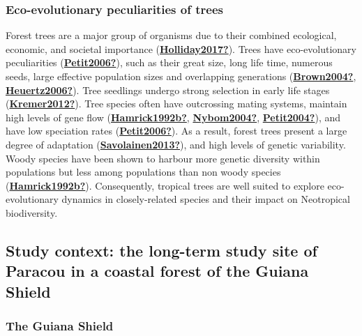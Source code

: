 \documentclass[12pt,twoside,a4paper, a]{article}
\begin{document}
\hypertarget{eco-evolutionary-peculiarities-of-trees}{%
\subsubsection{Eco-evolutionary peculiarities of trees}\label{eco-evolutionary-peculiarities-of-trees}}

Forest trees are a major group of organisms due to their combined ecological, economic, and societal importance (\protect\hyperlink{ref-Holliday2017}{\textbf{Holliday2017?}}).
Trees have eco-evolutionary peculiarities (\protect\hyperlink{ref-Petit2006}{\textbf{Petit2006?}}),
such as their great size, long life time, numerous seeds, large effective population sizes and overlapping generations (\protect\hyperlink{ref-Brown2004}{\textbf{Brown2004?}}, \protect\hyperlink{ref-Heuertz2006}{\textbf{Heuertz2006?}}).
Tree seedlings undergo strong selection in early life stages (\protect\hyperlink{ref-Kremer2012}{\textbf{Kremer2012?}}).
Tree species often have outcrossing mating systems, maintain high levels of gene flow (\protect\hyperlink{ref-Hamrick1992b}{\textbf{Hamrick1992b?}}, \protect\hyperlink{ref-Nybom2004}{\textbf{Nybom2004?}}, \protect\hyperlink{ref-Petit2004}{\textbf{Petit2004?}}), and have low speciation rates (\protect\hyperlink{ref-Petit2006}{\textbf{Petit2006?}}).
As a result, forest trees present a large degree of adaptation (\protect\hyperlink{ref-Savolainen2013}{\textbf{Savolainen2013?}}), and high levels of genetic variability.
Woody species have been shown to harbour more genetic diversity within populations but less among populations than non woody species (\protect\hyperlink{ref-Hamrick1992b}{\textbf{Hamrick1992b?}}).
Consequently, tropical trees are well suited to explore eco-evolutionary dynamics in closely-related species and their impact on Neotropical biodiversity.

\hypertarget{study-context-the-long-term-study-site-of-paracou-in-a-coastal-forest-of-the-guiana-shield}{%
\subsection{Study context: the long-term study site of Paracou in a coastal forest of the Guiana Shield}\label{study-context-the-long-term-study-site-of-paracou-in-a-coastal-forest-of-the-guiana-shield}}

\hypertarget{the-guiana-shield}{%
\subsubsection{The Guiana Shield}\label{the-guiana-shield}}
\end{document}
